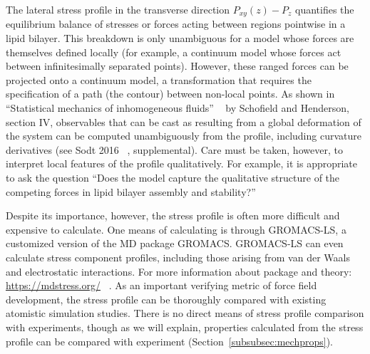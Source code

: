 \documentclass[9pt,bestpractices,pubversion]{livecoms}
\begin{document}
The lateral stress profile in the transverse direction $P_{xy}(z)-P_z$ quantifies the equilibrium balance of stresses or forces acting between regions pointwise in a lipid bilayer.
This breakdown is only unambiguous for a model whose forces are themselves defined locally (for example, a continuum model whose forces act between infinitesimally separated points).
However, these ranged forces can be projected onto a continuum model, a transformation that requires the specification of a path (the contour) between non-local points.
As shown in ``Statistical mechanics of inhomogeneous fluids'' ~\cite{Society2014} by Schofield and Henderson, section IV, observables that can be cast as resulting from a global deformation of the system can be computed unambiguously from the profile, including curvature derivatives (see Sodt 2016 ~\cite{Sodt2016}, supplemental).
Care must be taken, however, to interpret local features of the profile qualitatively.
For example, it is appropriate to ask the question ``Does the model capture the qualitative structure of the competing forces in lipid bilayer assembly and stability?''

Despite its importance, however, the stress profile is often more difficult and expensive to calculate.
One means of calculating is through GROMACS-LS, a customized version of the MD package GROMACS.
GROMACS-LS can even calculate stress component profiles, including those arising from van der Waals and electrostatic interactions.
For more information about package and theory: \url{https://mdstress.org/} ~\cite{Torres-Sanchez2016,Torres-Sanchez2015,Vanegas2014a,Ollila2009}.
As an important verifying metric of force field development, the stress profile can be thoroughly compared with existing atomistic simulation studies.
There is no direct means of stress profile comparison with experiments, though as we will explain, properties calculated from the stress profile can be compared with experiment (Section~\ref{subsubsec:mechprops}).
\end{document}
